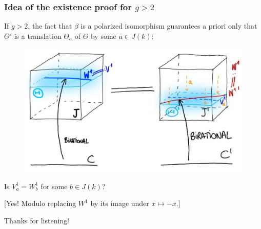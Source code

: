 \documentclass[notheorems, hyperref]{beamer}
\theoremstyle{darkgreentheorem}
\theoremstyle{darkbluedefinition}
\theoremstyle{darkredexample}
\theoremstyle{remark}
\begin{document}
\begin{frame}
    \frametitle{Idea of the existence proof for $g>2$}
    If $g>2$, the fact that $\beta$ is a polarized isomorphism guarantees a priori only that $\Theta'$ is a translation $\Theta_{a}$ of $\Theta$ by some $a\in J(k)$:
    \begin{figure}[htp]
	\centering
	\includegraphics[scale=.25]{genus3.jpg}
    \end{figure}
    \pause
    Is $V^{1}_{a}=W^{1}_{b}$ for some $b\in J(k)$?

    [Yes! Modulo replacing $W^{1}$ by its image under $x\mapsto -x$.]
\end{frame}

\begin{frame}
    \begin{center}
	  Thanks for listening!
    \end{center}
    
    
\end{frame}
\end{document}
